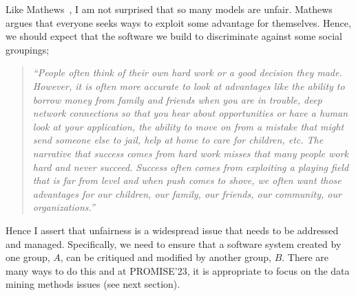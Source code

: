 \documentclass[sigconf,screen]{acmart}
\begin{document}
Like
Mathews~\cite{mathews23}, I am not surprised that so many models are unfair. 
Mathews argues that everyone seeks ways to exploit some advantage for themselves. Hence, we should
expect that the software we build to discriminate against some social groupings;
\begin{quote}

{\em 
    ``People often think of their own hard work or a good decision they made. However, it is often more accurate to look at advantages like the ability to borrow money from family and friends when you are in trouble, deep network connections so that you hear about opportunities or have a human look at your application,  the ability to move on from a mistake that might send someone else to jail, help at home to care for children,  etc. The narrative that success comes from hard work misses that many people work hard and never succeed. Success often comes from exploiting a playing field that is far from level and when push comes to shove, we often want those advantages for our children, our family, our friends, our community, our organizations.''}
 \end{quote}
Hence I assert that
unfairness is a widespread issue that needs to be addressed and managed. 
Specifically, we need 
to ensure that a software system created by one group, $A$, can be critiqued and modified by another group, $B$.
There are many ways to do this and at PROMISE'23, it is appropriate to focus on the data mining methods issues
(see next section). 
\end{document}
